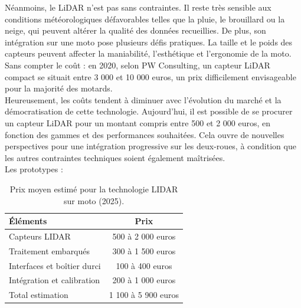 Néanmoins, le LiDAR n’est pas sans contraintes. Il reste très sensible aux conditions météorologiques défavorables telles que la pluie, le brouillard ou la neige, qui peuvent altérer la qualité des données recueillies. De plus, son intégration sur une moto pose plusieurs défis pratiques. La taille et le poids des capteurs peuvent affecter la maniabilité, l’esthétique et l’ergonomie de la moto. Sans compter le coût : en 2020, selon PW Consulting\cite{marche_capteur_lidar}, un capteur LiDAR compact se situait entre 3 000 et 10 000 euros, un prix difficilement envisageable pour la majorité des motards.\\

Heureusement, les coûts tendent à diminuer avec l’évolution du marché et la démocratisation de cette technologie. Aujourd’hui, il est possible de se procurer un capteur LiDAR pour un montant compris entre 500 et 2 000 euros, en fonction des gammes et des performances souhaitées. Cela ouvre de nouvelles perspectives pour une intégration progressive sur les deux-roues, à condition que les autres contraintes techniques soient également maîtrisées.\\

\vspace{0.5cm}
Les prototypes :\\
\begin{table}[ht]
\centering
\begin{tabular}{|l|c|}
  \hline
  Éléments & Prix \\
  \hline
  Capteurs LIDAR & 500 à 2 000 euros \\
  Traitement embarqués & 300 à 1 500 euros \\
  Interfaces et boîtier durci & 100 à 400 euros \\
  Intégration et calibration & 200 à 1 000 euros \\
  Total estimation & 1 100 à 5 900 euros \\
  \hline
\end{tabular}
\caption{Prix moyen estimé pour la technologie LIDAR sur moto (2025).}
\end{table}

